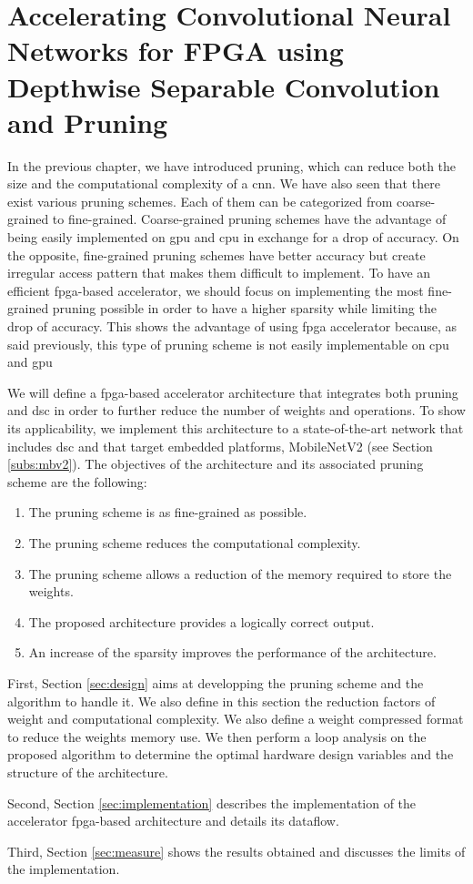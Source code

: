 \chapter{Accelerating Convolutional Neural Networks for FPGA using Depthwise Separable Convolution and Pruning} \label{chap:pratique}
%
%
In the previous chapter, we have introduced pruning, which can reduce both the size and the computational complexity of a \acrshort{cnn}. We have also seen that there exist various pruning schemes. Each of them can be categorized from coarse-grained to fine-grained. Coarse-grained pruning schemes have the advantage of being easily implemented on \acrshort{gpu} and \acrshort{cpu} in exchange for a drop of accuracy. On the opposite, fine-grained pruning schemes have better accuracy but create irregular access pattern that makes them difficult to implement. To have an efficient \acrshort{fpga}-based accelerator, we should focus on implementing the most fine-grained pruning possible in order to have a higher sparsity while limiting the drop of accuracy. This shows the advantage of using \acrshort{fpga} accelerator because, as said previously, this type of pruning scheme is not easily implementable on \acrshort{cpu} and \acrshort{gpu}

We will define a \acrshort{fpga}-based accelerator architecture that integrates both pruning and \acrshort{dsc} in order to further reduce the number of weights and operations. To show its applicability, we implement this architecture to a state-of-the-art network that includes \acrshort{dsc} and that target embedded platforms, MobileNetV2 (see Section \ref{subs:mbv2}). The objectives of the architecture and its associated pruning scheme are the following:
%
\begin{enumerate}
    \item The pruning scheme is as fine-grained as possible.
    \item The pruning scheme reduces the computational complexity.
    \item The pruning scheme allows a reduction of the memory required to store the weights.
    \item The proposed architecture provides a logically correct output.
    \item An increase of the sparsity improves the performance of the architecture.
\end{enumerate}
%
First, Section \ref{sec:design} aims at developping the pruning scheme and the algorithm to handle it. We also define in this section the reduction factors of weight and computational complexity. We also define a weight compressed format to reduce the weights memory use. We then perform a loop analysis on the proposed algorithm to determine the optimal hardware design variables and the structure of the architecture.

Second, Section \ref{sec:implementation} describes the implementation of the accelerator \acrshort{fpga}-based architecture and details its dataflow.

Third, Section \ref{sec:measure} shows the results obtained and discusses the limits of the implementation.
%
%

%
%

%
%

%
%
\afterpage{\blankpage}
\cleardoublepage
\newpage
